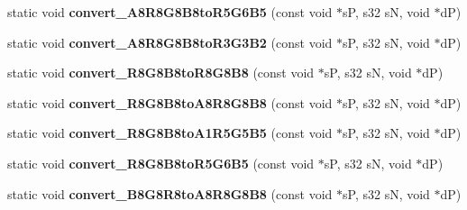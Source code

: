 \begin{DoxyCompactItemize}
\item 
\hypertarget{classirr_1_1video_1_1_c_color_converter_a5565677bcdaaabfc305d8c0c82308213}{static void {\bfseries convert\-\_\-\-A8\-R8\-G8\-B8to\-R5\-G6\-B5} (const void $\ast$s\-P, s32 s\-N, void $\ast$d\-P)}\label{classirr_1_1video_1_1_c_color_converter_a5565677bcdaaabfc305d8c0c82308213}

\item 
\hypertarget{classirr_1_1video_1_1_c_color_converter_aaab15f631dd859fcc6ef9f5c62d74cbd}{static void {\bfseries convert\-\_\-\-A8\-R8\-G8\-B8to\-R3\-G3\-B2} (const void $\ast$s\-P, s32 s\-N, void $\ast$d\-P)}\label{classirr_1_1video_1_1_c_color_converter_aaab15f631dd859fcc6ef9f5c62d74cbd}

\item 
\hypertarget{classirr_1_1video_1_1_c_color_converter_a1dd65320c2090f013a0862c56112ea35}{static void {\bfseries convert\-\_\-\-R8\-G8\-B8to\-R8\-G8\-B8} (const void $\ast$s\-P, s32 s\-N, void $\ast$d\-P)}\label{classirr_1_1video_1_1_c_color_converter_a1dd65320c2090f013a0862c56112ea35}

\item 
\hypertarget{classirr_1_1video_1_1_c_color_converter_a32562669ed74d25f245e8102ca13eb24}{static void {\bfseries convert\-\_\-\-R8\-G8\-B8to\-A8\-R8\-G8\-B8} (const void $\ast$s\-P, s32 s\-N, void $\ast$d\-P)}\label{classirr_1_1video_1_1_c_color_converter_a32562669ed74d25f245e8102ca13eb24}

\item 
\hypertarget{classirr_1_1video_1_1_c_color_converter_a1c368f96adfabe5ffcc3013606499c62}{static void {\bfseries convert\-\_\-\-R8\-G8\-B8to\-A1\-R5\-G5\-B5} (const void $\ast$s\-P, s32 s\-N, void $\ast$d\-P)}\label{classirr_1_1video_1_1_c_color_converter_a1c368f96adfabe5ffcc3013606499c62}

\item 
\hypertarget{classirr_1_1video_1_1_c_color_converter_a3866aee3822c6e8a1c11d895f40a4848}{static void {\bfseries convert\-\_\-\-R8\-G8\-B8to\-R5\-G6\-B5} (const void $\ast$s\-P, s32 s\-N, void $\ast$d\-P)}\label{classirr_1_1video_1_1_c_color_converter_a3866aee3822c6e8a1c11d895f40a4848}

\item 
\hypertarget{classirr_1_1video_1_1_c_color_converter_a81e4be184042ab16bb8b88bc61232996}{static void {\bfseries convert\-\_\-\-B8\-G8\-R8to\-A8\-R8\-G8\-B8} (const void $\ast$s\-P, s32 s\-N, void $\ast$d\-P)}\label{classirr_1_1video_1_1_c_color_converter_a81e4be184042ab16bb8b88bc61232996}


\end{DoxyCompactItemize}
